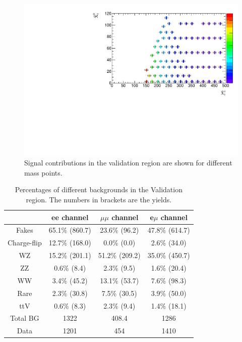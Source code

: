 \begin{figure}[htbp]
\begin{center}
\includegraphics[width=\textwidth]{data/plot/DataFakes/FakeEff/signal_contamination.pdf}
\caption{Signal contributions in the validation region are shown for different mass points.}
\label{fig:signal_contribution_fakes}
\end{center}
\end{figure}

\begin{table}[htbp]
\begin{center}
\begin{tabular}{|c|c|c|c|}
\hline
\hline
& ee channel & $\mu\mu$ channel & e$\mu$ channel\\
\hline
\hline
Fakes       & 65.1\% (860.7) & 23.6\% (96.2)  & 47.8\% (614.7) \\
Charge-flip & 12.7\% (168.0) &  0.0\% (0.0)   &  2.6\% (34.0)  \\
WZ          & 15.2\% (201.1) & 51.2\% (209.2) & 35.0\% (450.7) \\
ZZ          &  0.6\% (8.4)   &  2.3\% (9.5)   &  1.6\% (20.4)  \\
WW          &  3.4\% (45.2)  & 13.1\% (53.7)  &  7.6\% (98.3)  \\
Rare        &  2.3\% (30.8)  &  7.5\% (30.5)  &  3.9\% (50.0)  \\
ttV         &  0.6\% (8.3)   &  2.3\% (9.4)   &  1.4\% (18.1)  \\
\hline
Total BG    & 1322           & 408.4          & 1286 \\
\hline
Data        & 1201           & 454            & 1410 \\
\hline
\end{tabular}
\caption{Percentages of different backgrounds in the Validation region. The numbers in brackets are the yields.}
\label{tab:VRfakes_compos}
\end{center}
\end{table}

